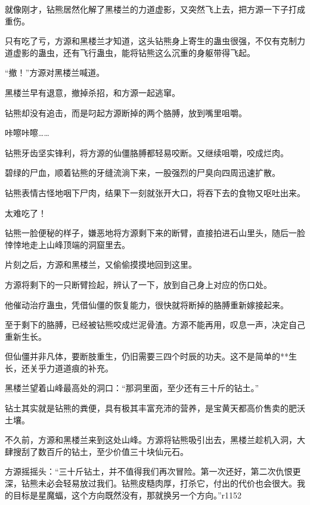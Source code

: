 \begin{this_body}
就像刚才，钻熊居然化解了黑楼兰的力道虚影，又突然飞上去，把方源一下子打成重伤。

只有吃了亏，方源和黑楼兰才知道，这头钻熊身上寄生的蛊虫很强，不仅有克制力道虚影的蛊虫，还有飞行蛊虫，能将钻熊这么沉重的身躯带得飞起。

“撤！”方源对黑楼兰喊道。

黑楼兰早有退意，撤掉杀招，和方源一起逃窜。

钻熊却没有追击，而是叼起方源断掉的两个胳膊，放到嘴里咀嚼。

咔嚓咔嚓……

钻熊牙齿坚实锋利，将方源的仙僵胳膊都轻易咬断。又继续咀嚼，咬成烂肉。

碧绿的尸血，顺着钻熊的牙缝流淌下来，一股强烈的尸臭向四周迅速扩散。

钻熊表情古怪地咽下尸肉，结果下一刻就张开大口，将吞下去的食物又呕吐出来。

太难吃了！

钻熊一脸便秘的样子，嫌恶地将方源剩下来的断臂，直接拍进石山里头，随后一脸悻悻地走上山峰顶端的洞窟里去。

片刻之后，方源和黑楼兰，又偷偷摸摸地回到这里。

方源将剩下的一只断臂捡起，辨认了一下，放到自己身上对应的伤口处。

他催动治疗蛊虫，凭借仙僵的恢复能力，很快就将断掉的胳膊重新嫁接起来。

至于剩下的胳膊，已经被钻熊咬成烂泥骨渣。方源不能再用，叹息一声，决定自己重新生长。

但仙僵并非凡体，要断肢重生，仍旧需要三四个时辰的功夫。这不是简单的**生长，还关乎力道道痕的补充。

黑楼兰望着山峰最高处的洞口：“那洞里面，至少还有三十斤的钻土。”

钻土其实就是钻熊的粪便，具有极其丰富充沛的营养，是宝黄天都高价售卖的肥沃土壤。

不久前，方源和黑楼兰来到这处山峰。方源将钻熊吸引出去，黑楼兰趁机入洞，大肆搜刮了数百斤的钻土，至少价值三十块仙元石。

方源摇摇头：“三十斤钻土，并不值得我们再次冒险。第一次还好，第二次仇恨更深，钻熊未必会轻易放过我们。钻熊皮糙肉厚，打杀它，付出的代价也会很大。我的目标是星魔蝠，这个方向既然没有，那就换另一个方向。”r1152

\end{this_body}

